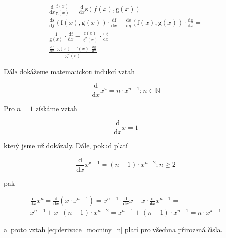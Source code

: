 \begin{equation}
\begin{split}
\frac{\mathrm{d}}{\mathrm{d}x} \frac{\mathrm{f}(x)}{\mathrm{g}(x)} = \frac{\mathrm{d}}{\mathrm{d}x} \mathrm{s}({f}(x), \mathrm{g}(x)) = \\
\frac{\mathrm{ds}}{\mathrm{d}f} (\mathrm{f}(x), \mathrm{g}(x)) \cdot \frac{\mathrm{df}}{\mathrm{d}x} + \frac{\mathrm{ds}}{\mathrm{d}g}(\mathrm{f}(x), \mathrm{g}(x)) \cdot \frac{\mathrm{dg}}{\mathrm{d}x} = \\
\frac{1}{\mathrm{g}(x)} \cdot \frac{\mathrm{df}}{\mathrm{d}x} -\frac{\mathrm{f}(x)}{\mathrm{g}^2(x)} \cdot \frac{\mathrm{dg}}{\mathrm{d}x} = \\
\frac{\frac{\mathrm{df}}{\mathrm{d}x} \cdot \mathrm{g}(x) - \mathrm{f}(x) \cdot \frac{\mathrm{dg}}{\mathrm{d}x}}{\mathrm{g}^2(x)}
\end{split}
\end{equation}

Dále dokážeme matematickou indukcí vztah

\begin{equation}
\label{eq:derivace_mocniny_n}
\frac{\mathrm{d}}{\mathrm{d}x} x^n = n \cdot x^{n-1}; n \in \mathbb{N}
\end{equation}

Pro \(n = 1\) získáme vztah 

\begin{equation}
\frac{\mathrm{d}}{\mathrm{d}x} x = 1
\end{equation}

který jsme už dokázaly. Dále, pokud platí 

\begin{equation}
\frac{\mathrm{d}}{\mathrm{d}x} x^{n-1} = (n - 1) \cdot x^{n-2}; n \geq 2
\end{equation}

pak

\begin{equation}
\begin{split}
\frac{\mathrm{d}}{\mathrm{d}x} x^n = \frac{\mathrm{d}}{\mathrm{d}x} (x \cdot x^{n-1}) = x^{n-1} \cdot \frac{\mathrm{d}}{\mathrm{d}x} x + x \cdot \frac{\mathrm{d}}{\mathrm{d}x} x^{n-1} = \\
x^{n-1} + x \cdot (n - 1) \cdot x^{n-2} = x^{n-1} + (n - 1) \cdot x^{n-1} = n \cdot x^{n-1}
\end{split}
\end{equation}

a~proto vztah \eqref{eq:derivace_mocniny_n} platí pro všechna přirozená čísla.

